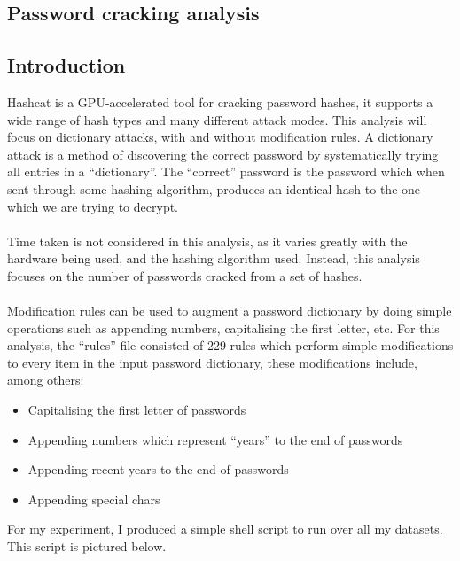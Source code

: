 \documentclass[11pt]{article}
\begin{document}
\subsection{Password cracking analysis}

\subsection{Introduction}
Hashcat is a GPU-accelerated tool for cracking password hashes, it supports a wide range of hash types and many different attack modes.
This analysis will focus on dictionary attacks, with and without modification rules.
A dictionary attack is a method of discovering the correct password by systematically trying all entries in a ``dictionary''.
The ``correct'' password is the password which when sent through some hashing algorithm, produces an identical hash to the one which we are trying to decrypt.\\\\
Time taken is not considered in this analysis, as it varies greatly with the hardware being used, and the hashing algorithm used.
Instead, this analysis focuses on the number of passwords cracked from a set of hashes.\\\\
Modification rules can be used to augment a password dictionary by doing simple operations such as appending numbers, capitalising the first letter, etc.
For this analysis, the ``rules'' file consisted of 229 rules which perform simple modifications to every item in the input password dictionary, these modifications include, among others:
\begin{itemize}
\item Capitalising the first letter of passwords
\item Appending numbers which represent ``years'' to the end of passwords
\item Appending recent years to the end of passwords
\item Appending special chars
\end{itemize}
For my experiment, I produced a simple shell script to run over all my datasets. This script is pictured below.
\begin{center}
\end{center}
\end{document}
